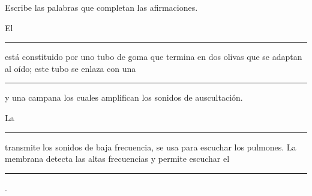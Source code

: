 Escribe las palabras que completan las afirmaciones.
\begin{parts}
    El \rule{3cm}{0.2mm} está constituido por uno tubo de goma que termina
    en dos olivas que se adaptan al oído; este tubo se enlaza con una \rule{3cm}{0.2mm}
    y una campana los cuales amplifican los sonidos de auscultación.


    La \rule{3cm}{0.2mm} transmite los sonidos de baja frecuencia, se usa para escuchar
    los pulmones.
    La membrana detecta las altas frecuencias y permite escuchar el \rule{3cm}{0.2mm}.
\end{parts}